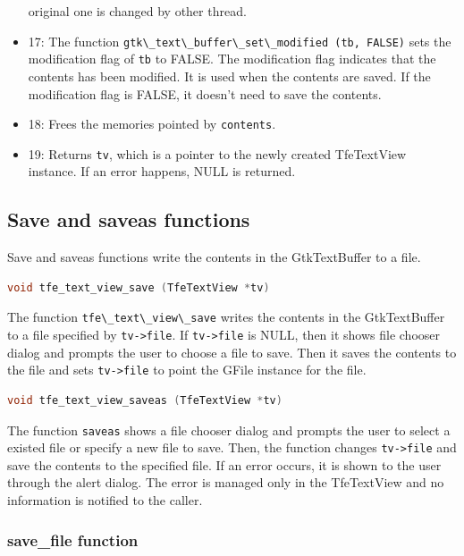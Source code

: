 \begin{itemize}
  original one is changed by other thread.
\item
  17: The function
  \passthrough{\lstinline!gtk\_text\_buffer\_set\_modified (tb, FALSE)!}
  sets the modification flag of \passthrough{\lstinline!tb!} to FALSE.
  The modification flag indicates that the contents has been modified.
  It is used when the contents are saved. If the modification flag is
  FALSE, it doesn't need to save the contents.
\item
  18: Frees the memories pointed by \passthrough{\lstinline!contents!}.
\item
  19: Returns \passthrough{\lstinline!tv!}, which is a pointer to the
  newly created TfeTextView instance. If an error happens, NULL is
  returned.
\end{itemize}

\subsection{Save and saveas functions}\label{save-and-saveas-functions}

Save and saveas functions write the contents in the GtkTextBuffer to a
file.

\begin{lstlisting}[language=C]
void tfe_text_view_save (TfeTextView *tv)
\end{lstlisting}

The function \passthrough{\lstinline!tfe\_text\_view\_save!} writes the
contents in the GtkTextBuffer to a file specified by
\passthrough{\lstinline!tv->file!}. If
\passthrough{\lstinline!tv->file!} is NULL, then it shows file chooser
dialog and prompts the user to choose a file to save. Then it saves the
contents to the file and sets \passthrough{\lstinline!tv->file!} to
point the GFile instance for the file.

\begin{lstlisting}[language=C]
void tfe_text_view_saveas (TfeTextView *tv)
\end{lstlisting}

The function \passthrough{\lstinline!saveas!} shows a file chooser
dialog and prompts the user to select a existed file or specify a new
file to save. Then, the function changes
\passthrough{\lstinline!tv->file!} and save the contents to the
specified file. If an error occurs, it is shown to the user through the
alert dialog. The error is managed only in the TfeTextView and no
information is notified to the caller.

\subsubsection{save\_file function}\label{save_file-function}

